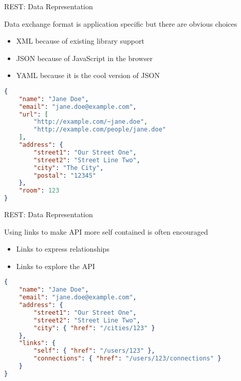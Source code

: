 \begin{frame}[fragile]{REST: Data Representation}

    Data exchange format is application specific but there are obvious choices
    \begin{itemize}
        \item XML because of existing library support
        \item JSON because of JavaScript in the browser
        \item YAML because it is the cool version of JSON
    \end{itemize}

\begin{lstlisting}[language=json,style=mini]
{
    "name": "Jane Doe",
    "email": "jane.doe@example.com",
    "url": [
        "http://example.com/~jane.doe",
        "http://example.com/people/jane.doe"
    ],
    "address": {
        "street1": "Our Street One",
        "street2": "Street Line Two",
        "city": "The City",
        "postal": "12345"
    },
    "room": 123
}
\end{lstlisting}
\end{frame}


\begin{frame}[fragile]{REST: Data Representation}

    Using links to make API more self contained is often encouraged
    \begin{itemize}
        \item Links to express relationships
        \item Links to explore the API
    \end{itemize}

\begin{lstlisting}[language=json,style=mini]
{
    "name": "Jane Doe",
    "email": "jane.doe@example.com",
    "address": {
        "street1": "Our Street One",
        "street2": "Street Line Two",
        "city": { "href": "/cities/123" }
    },
    "links": {
        "self": { "href": "/users/123" },
        "connections": { "href": "/users/123/connections" }
    }
}
\end{lstlisting}
\end{frame}



